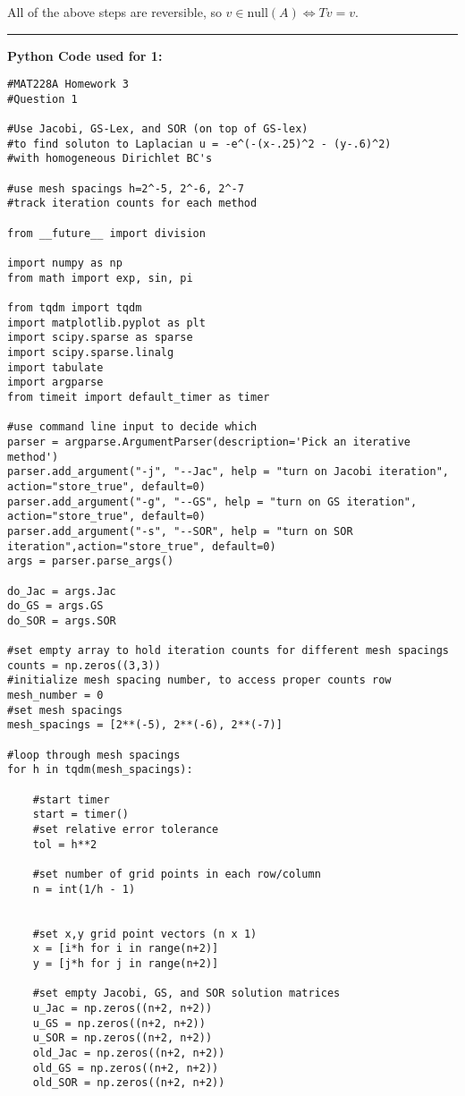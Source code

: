 \documentclass[12pt]{article}
\begin{document}
All of the above steps are reversible, so $v \in \text{null}(A) \iff Tv = v$.

\noindent\rule{17cm}{0.4pt}

\noindent \textbf{Python Code used for 1:}
\begin{verbatim}
#MAT228A Homework 3
#Question 1 

#Use Jacobi, GS-Lex, and SOR (on top of GS-lex)
#to find soluton to Laplacian u = -e^(-(x-.25)^2 - (y-.6)^2)
#with homogeneous Dirichlet BC's

#use mesh spacings h=2^-5, 2^-6, 2^-7
#track iteration counts for each method

from __future__ import division

import numpy as np
from math import exp, sin, pi

from tqdm import tqdm
import matplotlib.pyplot as plt
import scipy.sparse as sparse
import scipy.sparse.linalg
import tabulate
import argparse
from timeit import default_timer as timer 

#use command line input to decide which 
parser = argparse.ArgumentParser(description='Pick an iterative method')
parser.add_argument("-j", "--Jac", help = "turn on Jacobi iteration", action="store_true", default=0)
parser.add_argument("-g", "--GS", help = "turn on GS iteration", action="store_true", default=0)
parser.add_argument("-s", "--SOR", help = "turn on SOR iteration",action="store_true", default=0)
args = parser.parse_args()

do_Jac = args.Jac
do_GS = args.GS
do_SOR = args.SOR

#set empty array to hold iteration counts for different mesh spacings
counts = np.zeros((3,3))
#initialize mesh spacing number, to access proper counts row
mesh_number = 0
#set mesh spacings
mesh_spacings = [2**(-5), 2**(-6), 2**(-7)]

#loop through mesh spacings
for h in tqdm(mesh_spacings):

	#start timer
	start = timer()
	#set relative error tolerance
	tol = h**2

	#set number of grid points in each row/column
	n = int(1/h - 1)

	
	#set x,y grid point vectors (n x 1)
	x = [i*h for i in range(n+2)]
	y = [j*h for j in range(n+2)]
	
	#set empty Jacobi, GS, and SOR solution matrices
	u_Jac = np.zeros((n+2, n+2))
	u_GS = np.zeros((n+2, n+2))
	u_SOR = np.zeros((n+2, n+2))
	old_Jac = np.zeros((n+2, n+2))
	old_GS = np.zeros((n+2, n+2))
	old_SOR = np.zeros((n+2, n+2))



\end{verbatim}
\end{document}
